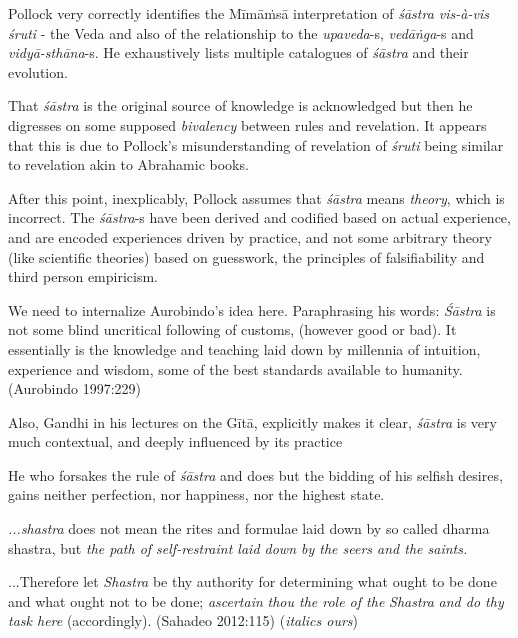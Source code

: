 Pollock very correctly identifies the Mīmāṁsā interpretation of {\sl śāstra vis-à-vis śruti} - the Veda and also of the relationship to the {\sl upaveda}-s, {\sl vedāṅga}-s and  {\sl vidyā-sthāna}-s. He exhaustively lists multiple catalogues of {\sl śāstra} and their evolution.

That {\sl śāstra} is the original source of knowledge is acknowledged but then he digresses on some supposed {\sl bivalency} between rules and revelation. It appears that this is due to Pollock's misunderstanding of revelation of {\sl śruti} being similar to revelation akin to Abrahamic books.

After this point, inexplicably, Pollock assumes that {\sl śāstra} means {\sl theory}, which is incorrect. The {\sl śāstra}-s have been derived and codified based on actual experience, and are encoded experiences driven by practice, and not some arbitrary theory (like scientific theories) based on guesswork, the principles of falsifiability and third person empiricism.

We need to internalize Aurobindo's idea here. Paraphrasing his words:
{{\sl Śāstra}} is not some blind uncritical following of customs, (however good or bad). It essentially is the knowledge and teaching laid down by millennia of intuition, experience and wisdom, some of the best standards available to humanity. (Aurobindo 1997:229)


Also, Gandhi in his lectures on the Gītā, explicitly makes it clear, {\sl śāstra} is very much contextual, and deeply influenced by its practice
\begin{myquote}
He who forsakes the rule of {\sl śāstra} and does but the bidding of his selfish desires, gains neither perfection, nor happiness, nor the highest state.

{\sl ...shastra} does not mean the rites and formulae laid down by so called dharma shastra, but {\sl the path of self-restraint laid down by the seers and the saints.}

...Therefore let {\sl Shastra} be thy authority for determining what ought to be done and what ought not to be done; {{\sl ascertain}\relax} {\sl thou the role of the} {{\sl Shastra}\relax} {\sl and do thy task here} (accordingly).
\hfill (Sahadeo 2012:115) ({\sl italics ours})
\end{myquote}

